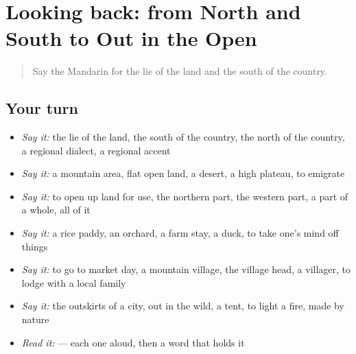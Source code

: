 \section[(dialogue)]{Looking back: from North and South to Out in the Open}

\label{lesson:ZH-R441-review-436-441}



\begin{quote}
Say the Mandarin for the lie of the land and the south of the country.
\end{quote}

\subsection*{Your turn}
\begin{itemize}
\raggedright
  \item \emph{Say it:} the lie of the land, the south of the country, the north of the country, a regional dialect, a regional accent
  \item \emph{Say it:} a mountain area, flat open land, a desert, a high plateau, to emigrate
  \item \emph{Say it:} to open up land for use, the northern part, the western part, a part of a whole, all of it
  \item \emph{Say it:} a rice paddy, an orchard, a farm stay, a duck, to take one's mind off things
  \item \emph{Say it:} to go to market day, a mountain village, the village head, a villager, to lodge with a local family
  \item \emph{Say it:} the outskirts of a city, out in the wild, a tent, to light a fire, made by nature
  \item \emph{Read it:}    — each one aloud, then a word that holds it
\end{itemize}

